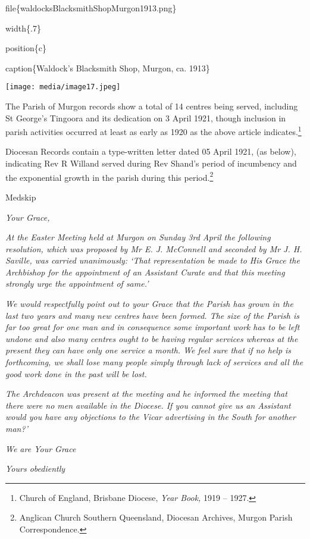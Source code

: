file\{waldocksBlacksmithShopMurgon1913.png\}

width\{.7\}

position\{c\}

caption\{Waldock's Blacksmith Shop, Murgon, ca. 1913\}

\texttt{[image: media/image17.jpeg]}

The Parish of Murgon records show a total of 14 centres being served, including St George's Tingoora and its dedication on 3 April 1921, though inclusion in parish activities occurred at least as early as 1920 as the above article indicates.\footnote{Church of England, Brisbane Diocese, \emph{Year Book,} 1919 -- 1927.}

Diocesan Records contain a type-written letter dated 05 April 1921, (as below), indicating Rev R Willand served during Rev Shand's period of incumbency and the exponential growth in the parish during this period.\footnote{Anglican Church Southern Queensland, Diocesan Archives, Murgon Parish Correspondence.}

Medskip

\emph{Your Grace,}

\emph{At the Easter Meeting held at Murgon on Sunday 3rd April the following resolution, which was proposed by Mr E. J. McConnell and seconded by Mr J. H. Saville, was carried unanimously: `That representation be made to His Grace the Archbishop for the appointment of an Assistant Curate and that this meeting strongly urge the appointment of same.'}

\emph{We would respectfully point out to your Grace that the Parish has grown in the last two years and many new centres have been formed. The size of the Parish is far too great for one man and in consequence some important work has to be left undone and also many centres ought to be having regular services whereas at the present they can have only one service a month. We feel sure that if no help is forthcoming, we shall lose many people simply through lack of services and all the good work done in the past will be lost.}

\emph{The Archdeacon was present at the meeting and he informed the meeting that there were no men available in the Diocese. If you cannot give us an Assistant would you have any objections to the Vicar advertising in the South for another man?'}

\emph{We are Your Grace}

\emph{Yours obediently}

